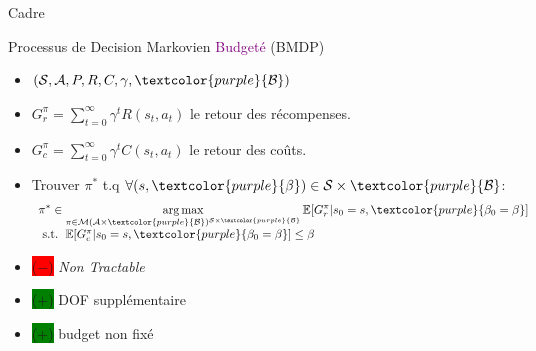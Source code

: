 \documentclass[french]{beamer}
\newcommand{\cplus}{\colorbox{green}{($+$)} }
\newcommand{\cmoins}{\colorbox{red}{($-$)} }
\begin{document}
    \begin{frame}{Cadre}

        \begin{block}{Processus de Decision Markovien \textcolor{purple}{Budgeté} (BMDP)}
            \begin{itemize}
                \item $(\cS, \cA, P, R,{C}, \gamma,\textcolor{purple}{\cB})$
                \item $G_r^\pi = \sum_{t=0}^\infty \gamma^t R(s_t, a_t)$ le retour des récompenses.
                \item  $G_c^\pi = \sum_{t=0}^\infty \gamma^t C(s_t, a_t)$ le retour des coûts.
                \item Trouver $\pi^*$ t.q $\forall (s,\textcolor{purple}{\beta})\in\cS\times\textcolor{purple}{\cB}$:
                \begin{equation}
                    \label{eq:bmdp}
                    \begin{array}{lcr}
                        \displaystyle \pi^* \in \argmax_{\pi\in\cM(\cA\times\textcolor{purple}{\cB})^{\cS\times\textcolor{purple}{\cB}}} \expectedvalue[G_r^\pi | s_0=s,\textcolor{purple}{\beta_0=\beta}] \\
                        \text{ s.t. }  \expectedvalue[G_c^\pi | s_0=s,\textcolor{purple}{\beta_0=\beta}] \leq \beta
                    \end{array}
                \end{equation}
            \end{itemize}
        \end{block}


        \begin{block}{}
            \begin{itemize}
                \item \cmoins \textit{Non Tractable}
                \item \cplus DOF supplémentaire
                \item \cplus budget non fixé

            \end{itemize}
        \end{block}

    \end{frame}
\end{document}
